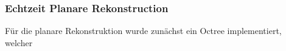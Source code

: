 \subsubsection*{Echtzeit Planare Rekonstruction}

Für die planare Rekonstruktion wurde zunächst ein Octree implementiert, welcher 